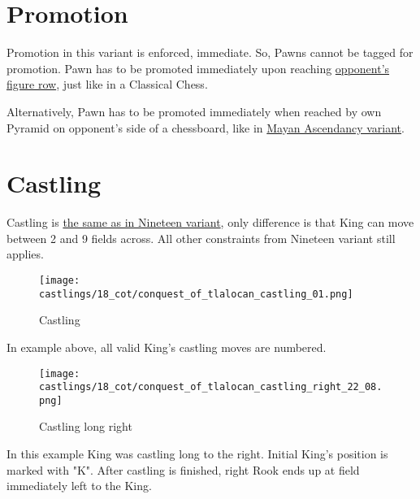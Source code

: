 
\section*{Promotion}
\label{sec:Conquest of Tlalocan/Promotion}

Promotion in this variant is enforced, immediate. So, Pawns cannot be tagged
for promotion. Pawn has to be promoted immediately upon reaching
\hyperref[sec:Terms/Figure row]{opponent's figure row},
just like in a Classical Chess.

Alternatively, Pawn has to be promoted immediately when reached by own Pyramid
on opponent's side of a chessboard, like in
\hyperref[sec:Mayan Ascendancy/Pyramid/Promotion]{Mayan Ascendancy variant}.

\clearpage %

\section*{Castling}
\label{sec:Conquest of Tlalocan/Castling}

Castling is
\hyperref[sec:Nineteen/Castling]{the same as in Nineteen variant},
only difference is that King can move
between 2 and 9 fields across. All other constraints from Nineteen variant still
applies.

\noindent
\begin{figure}[!h]
\texttt{[image: castlings/18\_cot/conquest\_of\_tlalocan\_castling\_01.png]}
\caption{Castling}
\label{fig:conquest_of_tlalocan_castling_01}
\end{figure}

In example above, all valid King's castling moves are numbered.

\noindent
\begin{figure}[!h]
\texttt{[image: castlings/18\_cot/conquest\_of\_tlalocan\_castling\_right\_22\_08.png]}
\caption{Castling long right}
\label{fig:conquest_of_tlalocan_castling_right_22_08}
\end{figure}

In this example King was castling long to the right. Initial King's position
is marked with "K". After castling is finished, right Rook ends up at field
immediately left to the King.

